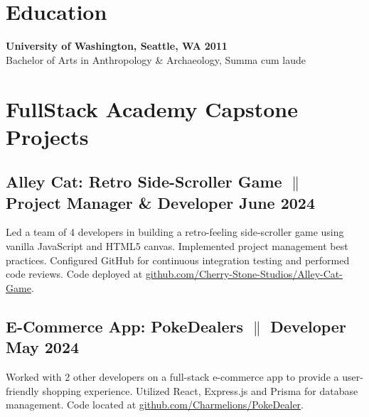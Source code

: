 \documentclass[a4paper,9pt]{article}
\begin{document}
\section{Education}
\textbf{University of Washington, Seattle, WA} \hfill
\textbf{2011}
\\
Bachelor of Arts in Anthropology \& Archaeology, Summa cum laude

\section{FullStack Academy Capstone Projects}

\subsection{Alley Cat: Retro Side-Scroller Game {$\parallel$}{
                  Project Manager
                  \& Developer}
      \hfill \textbf{June 2024}}
{\small Led a team of 4 developers in building a retro-feeling
      side-scroller game using vanilla JavaScript and HTML5 canvas.
      Implemented
      project management best practices. Configured GitHub for continuous integration testing and
      performed
      code reviews. Code deployed at \href{https://github.com/Cherry-Stone-Studios/Alley-Cat-Game}{github.com/Cherry-Stone-Studios/Alley-Cat-Game}.}

\subsection{E-Commerce App: PokeDealers {$\parallel$}{ Developer}
      \hfill \textbf{May 2024}}
{\small Worked with 2 other developers on a full-stack e-commerce
      app to provide a user-friendly shopping experience. Utilized React, Express.js and Prisma for database management. Code located
      at \href{https://github.com/Charmelions/PokeDealer}{github.com/Charmelions/PokeDealer}.}
\end{document}
